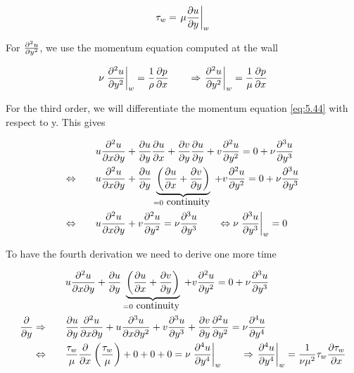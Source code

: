 	\begin{equation}
		\tau _w = \left. \mu \frac{\partial u}{\partial y}\right| _w
	\end{equation}
	
	For $\frac{\partial ^2 u}{\partial y^2}$, we use the momentum equation computed at the wall
	
	\begin{equation}
		\nu \left.\frac{\partial ^2 u}{\partial y^2}\right| _w = \frac{1}{\rho}\frac{\partial p}{\partial x} \qquad \Rightarrow \left.\frac{\partial ^2 u}{\partial y^2}\right| _w  = \frac{1}{\mu}\frac{\partial p}{\partial x}
	\end{equation}
	
	For the third order, we will differentiate the momentum equation \eqref{eq:5.44} with respect to y. This gives
	
	\begin{equation}
	\begin{aligned}
		&u \frac{\partial ^2 u}{\partial x \partial y} + \frac{\partial u}{\partial y}\frac{\partial u}{\partial x} + \frac{\partial v}{\partial y} \frac{\partial u}{\partial y} + v \frac{\partial ^2 u}{\partial y^2} =0+ \nu \frac{\partial ^3 u}{\partial y^3}\\
		\Leftrightarrow  \qquad
		&u \frac{\partial ^2 u}{\partial x \partial y} + \frac{\partial u}{\partial y}\underbrace{\left(\frac{\partial u}{\partial x} + \frac{\partial v}{\partial y}\right)}_{=0 \mbox{ continuity }} + v \frac{\partial ^2 u}{\partial y^2} =0+ \nu \frac{\partial ^3 u}{\partial y^3} \\
		\Leftrightarrow  \qquad 
		&u \frac{\partial ^2 u}{\partial x \partial y} + v \frac{\partial ^2 u}{\partial y^2} =  \nu \frac{\partial ^3 u}{\partial y^3} \qquad \Leftrightarrow \nu \left.\frac{\partial ^3 u}{\partial y^3}\right| _w = 0 
	\end{aligned}
	\end{equation}
	
	To have the fourth derivation we need to derive one more time 
	
	\begin{equation}
	\begin{aligned}
	&u \frac{\partial ^2 u}{\partial x \partial y} + \frac{\partial u}{\partial y}\underbrace{\left(\frac{\partial u}{\partial x} + \frac{\partial v}{\partial y}\right)}_{=0 \mbox{ continuity }} + v \frac{\partial ^2 u}{\partial y^2} =0+ \nu \frac{\partial ^3 u}{\partial y^3} \\
		\frac{\partial}{\partial y}\Rightarrow  \qquad 
		&\frac{\partial u}{\partial y}\frac{\partial ^2 u}{\partial x \partial y} +  u\frac{\partial ^3 u}{\partial x \partial y^2} + v \frac{\partial ^3 u}{\partial y^3} + \frac{\partial v}{\partial y} \frac{\partial ^2 u}{\partial y^2} = \nu \frac{\partial ^4 u}{\partial y^4} \\
		\Leftrightarrow \qquad &\frac{\tau _w}{\mu}\frac{\partial}{\partial x}\left(\frac{\tau _w}{\mu}\right) + 0 + 0 +  0 = \nu \left.\frac{\partial ^4 u}{\partial y^4}\right| _w \qquad \Rightarrow \left.\frac{\partial ^4 u}{\partial y^4}\right| _w = \frac{1}{\nu \mu ^2}\tau _w \frac{\partial\tau _w}{\partial x}
	\end{aligned}
	\end{equation}
	
